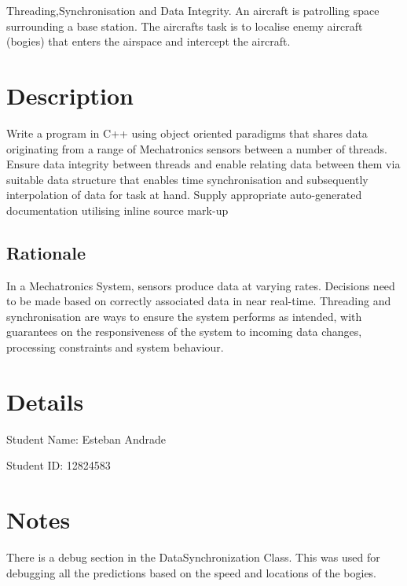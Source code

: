 Threading,Synchronisation and Data Integrity. An aircraft is patrolling space surrounding a base station. The aircrafts task is to localise enemy aircraft (bogies) that enters the airspace and intercept the aircraft.\hypertarget{index_Description}{}\section{Description}\label{index_Description}
Write a program in C++ using object oriented paradigms that shares data originating from a range of Mechatronics sensors between a number of threads. Ensure data integrity between threads and enable relating data between them via suitable data structure that enables time synchronisation and subsequently interpolation of data for task at hand. Supply appropriate auto-\/generated documentation utilising inline source mark-\/up\hypertarget{index_Rationale}{}\subsection{Rationale}\label{index_Rationale}
In a Mechatronics System, sensors produce data at varying rates. Decisions need to be made based on correctly associated data in near real-\/time. Threading and synchronisation are ways to ensure the system performs as intended, with guarantees on the responsiveness of the system to incoming data changes, processing constraints and system behaviour.\hypertarget{index_Details}{}\section{Details}\label{index_Details}

\begin{DoxyItemize}
\item Student Name\+: Esteban Andrade~\newline

\item Student ID\+: 12824583
\end{DoxyItemize}\hypertarget{index_Notes}{}\section{Notes}\label{index_Notes}
There is a debug section in the Data\+Synchronization Class. This was used for debugging all the predictions based on the speed and locations of the bogies.

